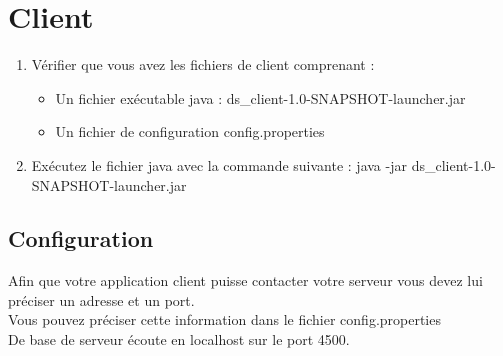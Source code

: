 \documentclass[a4paper,10pt]{report}
\begin{document}
\section{Client}
\begin{enumerate}
 \item Vérifier que vous avez les fichiers de client comprenant :
\begin{itemize}
 \item Un fichier exécutable java : ds\_client-1.0-SNAPSHOT-launcher.jar
 \item Un fichier de configuration config.properties
\end{itemize}
 \item Exécutez le fichier java avec la commande suivante : java -jar ds\_client-1.0-SNAPSHOT-launcher.jar
\end{enumerate}

\subsection{Configuration}
Afin que votre application client puisse contacter votre serveur vous devez lui préciser un adresse et un port.\\
Vous pouvez préciser cette information dans le fichier config.properties\\
De base de serveur écoute en localhost sur le port 4500.
\end{document}
